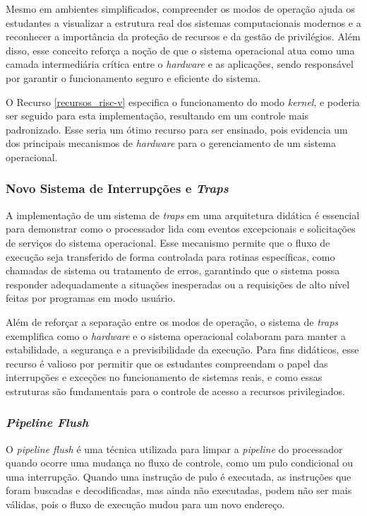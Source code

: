 \documentclass[
	12pt,				%
	openright,			%
	oneside,			%
	a4paper,			%
	english,			%
	french,				%
	spanish,			%
	brazil,				%
	]{abntex2}
\begin{document}
Mesmo em ambientes simplificados, compreender os modos de operação ajuda os estudantes a visualizar a estrutura real dos sistemas computacionais modernos e a reconhecer a importância da proteção de recursos e da gestão de privilégios. Além disso, esse conceito reforça a noção de que o sistema operacional atua como uma camada intermediária crítica entre o \textit{hardware} e as aplicações, sendo responsável por garantir o funcionamento seguro e eficiente do sistema.

O Recurso \ref{recursos_risc-v} especifica o funcionamento do modo \textit{kernel}, e poderia ser seguido para esta implementação, resultando em um controle mais padronizado. Esse seria um ótimo recurso para ser ensinado, pois evidencia um dos principais mecanismos de \textit{hardware} para o gerenciamento de um sistema operacional.

\subsubsection{Novo Sistema de Interrupções e \textit{Traps}}\label{recursos_interrupt}%
A implementação de um sistema de \textit{traps} em uma arquitetura didática é essencial para demonstrar como o processador lida com eventos excepcionais e solicitações de serviços do sistema operacional. Esse mecanismo permite que o fluxo de execução seja transferido de forma controlada para rotinas específicas, como chamadas de sistema ou tratamento de erros, garantindo que o sistema possa responder adequadamente a situações inesperadas ou a requisições de alto nível feitas por programas em modo usuário.

Além de reforçar a separação entre os modos de operação, o sistema de \textit{traps} exemplifica como o \textit{hardware} e o sistema operacional colaboram para manter a estabilidade, a segurança e a previsibilidade da execução. Para fins didáticos, esse recurso é valioso por permitir que os estudantes compreendam o papel das interrupções e exceções no funcionamento de sistemas reais, e como essas estruturas são fundamentais para o controle de acesso a recursos privilegiados.

\subsubsection{\textit{Pipeline Flush}}\label{recursos_pipe_flush}%

O \textit{pipeline flush} é uma técnica utilizada para limpar a \textit{pipeline} do processador quando ocorre uma mudança no fluxo de controle, como um pulo condicional ou uma interrupção. Quando uma instrução de pulo é executada, as instruções que foram buscadas e decodificadas, mas ainda não executadas, podem não ser mais válidas, pois o fluxo de execução mudou para um novo endereço.
\end{document}

